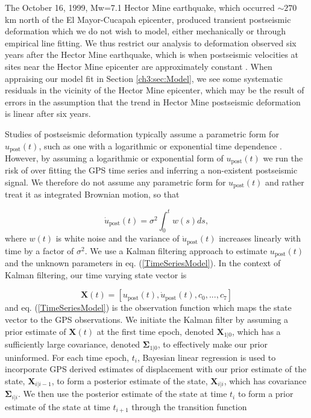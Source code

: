 The October 16, 1999, Mw=7.1 Hector Mine earthquake, which occurred ${\sim}270$ km north of the El Mayor-Cucapah epicenter, produced transient postseismic deformation which we do not wish to model, either mechanically or through empirical line fitting.  We thus restrict our analysis to deformation observed six years after the Hector Mine earthquake, which is when postseismic velocities at sites near the Hector Mine epicenter are approximately constant \citep{Savage2009}. When appraising our model fit in Section \ref{ch3:sec:Model}, we see some systematic residuals in the vicinity of the Hector Mine epicenter, which may be the result of errors in the assumption that the trend in Hector Mine postseismic deformation is linear after six years.   

Studies of postseismic deformation typically assume a parametric form for $u_\mathrm{post}(t)$, such as one with a logarithmic or exponential time dependence \citep[e.g.][]{Savage2005a}.  However, by assuming a logarithmic or exponential form of $u_\mathrm{post}(t)$ we run the risk of over fitting the GPS time series and inferring a non-existent postseismic signal. We therefore do not assume any parametric form for $u_\mathrm{post}(t)$ and rather treat it as integrated Brownian motion, so that 

\begin{equation}
    \dot{u}_\mathrm{post}(t) = \sigma^2\int_0^t w(s) ds,
\end{equation}    
where $w(t)$ is white noise and the variance of $\dot{u}_\mathrm{post}(t)$ increases linearly with time by a factor of $\sigma^2$. We use a Kalman filtering approach to estimate $u_\mathrm{post}(t)$ and the unknown parameters in eq. (\ref{TimeSeriesModel}).  In the context of Kalman filtering, our time varying state vector is

\begin{equation}
    \mathbf{X}(t) = [u_\mathrm{post}(t),\dot u_\mathrm{post}(t), c_0, ..., c_7]
\end{equation}
and eq. (\ref{TimeSeriesModel}) is the observation function which maps the state vector to the GPS observations. We initiate the Kalman filter by assuming a prior estimate of $\mathbf{X}(t)$ at the first time epoch, denoted $\mathbf{X}_{1|0}$, which has a sufficiently large covariance, denoted $\mathbf{\Sigma}_{1|0}$, to effectively make our prior uninformed.  For each time epoch, $t_i$, Bayesian linear regression is used to incorporate GPS derived estimates of displacement with our prior estimate of the state, $\mathbf{X}_{i|i-1}$, to form a posterior estimate of the state, $\mathbf{X}_{i|i}$, which has covariance $\mathbf{\Sigma}_{i|i}$.  We then use the posterior estimate of the state at time $t_i$ to form a prior estimate of the state at time $t_{i+1}$ through the transition function

